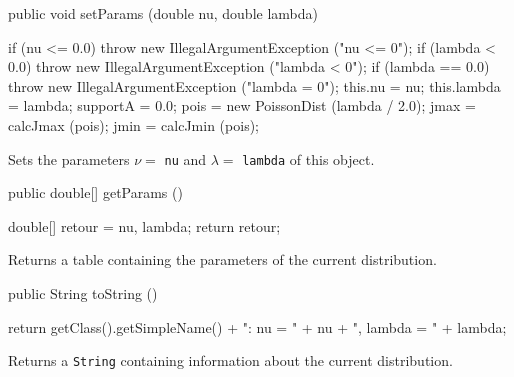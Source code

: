  \begin{code}

   public void setParams (double nu, double lambda)\begin{hide} {
      if (nu <= 0.0)
         throw new IllegalArgumentException ("nu <= 0");
      if (lambda < 0.0)
         throw new IllegalArgumentException ("lambda < 0");
      if (lambda == 0.0)
         throw new IllegalArgumentException ("lambda = 0");
      this.nu = nu;
      this.lambda = lambda;
      supportA = 0.0;
      pois = new PoissonDist (lambda / 2.0);
      jmax = calcJmax (pois);
      jmin = calcJmin (pois);
   }\end{hide}
\end{code}
 \begin{tabb} Sets the parameters $\nu =$ \texttt{nu} and $\lambda = $
  \texttt{lambda} of this object.
 \end{tabb}
 \begin{code}

   public double[] getParams ()\begin{hide} {
      double[] retour = {nu, lambda};
      return retour;
   }\end{hide}
\end{code}
\begin{tabb}
   Returns a table containing the parameters of the current distribution.
\end{tabb}
\begin{hide}\begin{code}

   public String toString ()\begin{hide} {
      return getClass().getSimpleName() + ":   nu = " + nu + ",   lambda = " + lambda;
   }\end{hide}
\end{code}
\begin{tabb}
   Returns a \texttt{String} containing information about the current distribution.
\end{tabb}\end{hide}
\begin{code}\begin{hide}
}\end{hide}
\end{code}
